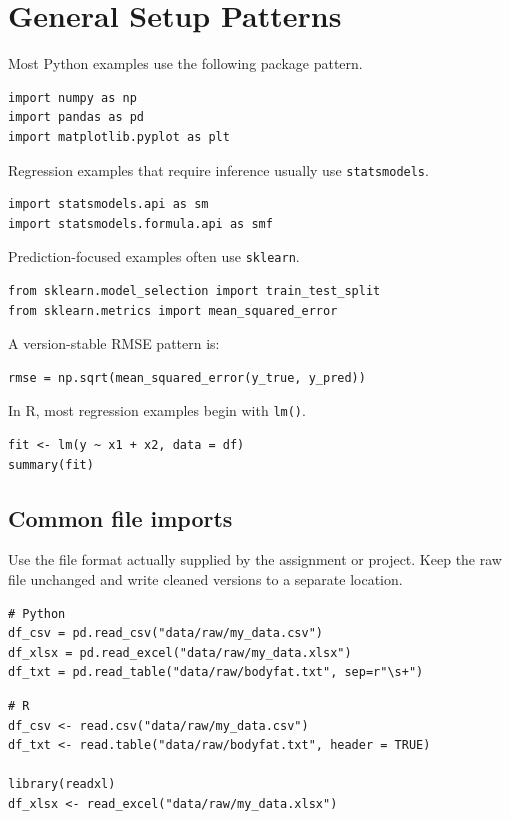 \section{General Setup Patterns}
\label{app:cookbook-general-setup}

Most Python examples use the following package pattern.

\begin{verbatim}
import numpy as np
import pandas as pd
import matplotlib.pyplot as plt
\end{verbatim}

Regression examples that require inference usually use \texttt{statsmodels}.

\begin{verbatim}
import statsmodels.api as sm
import statsmodels.formula.api as smf
\end{verbatim}

Prediction-focused examples often use \texttt{sklearn}.

\begin{verbatim}
from sklearn.model_selection import train_test_split
from sklearn.metrics import mean_squared_error
\end{verbatim}

A version-stable RMSE pattern is:

\begin{verbatim}
rmse = np.sqrt(mean_squared_error(y_true, y_pred))
\end{verbatim}

In R, most regression examples begin with \texttt{lm()}.

\begin{verbatim}
fit <- lm(y ~ x1 + x2, data = df)
summary(fit)
\end{verbatim}

\subsection*{Common file imports}

Use the file format actually supplied by the assignment or project.  Keep the raw file unchanged and write cleaned versions to a separate location.

\begin{verbatim}
# Python
df_csv = pd.read_csv("data/raw/my_data.csv")
df_xlsx = pd.read_excel("data/raw/my_data.xlsx")
df_txt = pd.read_table("data/raw/bodyfat.txt", sep=r"\s+")
\end{verbatim}

\begin{verbatim}
# R
df_csv <- read.csv("data/raw/my_data.csv")
df_txt <- read.table("data/raw/bodyfat.txt", header = TRUE)

library(readxl)
df_xlsx <- read_excel("data/raw/my_data.xlsx")
\end{verbatim}

